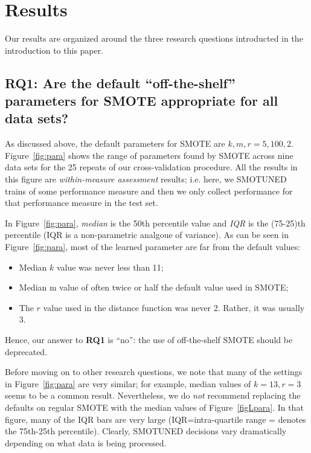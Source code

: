 \documentclass[10pt,conference]{IEEEtran}
\newcommand{\bi}{\begin{itemize}[leftmargin=0.4cm]}
\newcommand{\ei}{\end{itemize}}
\theoremstyle{break}
\theoremstyle{break}
\begin{document}
 
   

\section{Results}
\label{sect:results}

Our results are organized around the three
research questions introducted in the introduction
to this paper.

 \subsection{{\bf RQ1}: Are the default ``off-the-shelf'' parameters for SMOTE appropriate for all
 data sets?}
 
 
 As discussed above, the default parameters for
 SMOTE are $k,m,r = 5,100,2$.
  Figure~\ref{fig:para} shows the range of parameters
 found by SMOTE across  nine data sets for the 25 repeats of our cross-validation procedure.
 All the results in this figure are {\em within-measure assessment} results; i.e.
 here, we SMOTUNED trains of some performance measure and then we only collect performance for that performance measure in the test set.
 
 
 In  Figure~\ref{fig:para}, {\em median} is the 50th percentile
 value and {\em IQR} is the (75-25)th percentile
 (IQR is a non-parametric analgoue of variance).
 As can be seen in Figure~\ref{fig:para}, most of the learned parameter are far from the default values:
 \bi
 \item 
 Median $k$ value was never less than 11;
 \item
 Median m value of often twice or half the default value used in SMOTE;
 \item
 The $r$ value used in the distance function was never 2. Rather, it was usually 3.
 \ei
 Hence,  our answer to {\bf RQ1} is ``no'': the use of off-the-shelf SMOTE should be deprecated. 
   
Before moving on to other research questions, we note that many of the settings in Figure~\ref{fig:para} are very similar; for example, median values of $k=13,r=3$ seems to be a common
result.  Nevertheless, we do {\em not} recommend replacing
the defaults on regular SMOTE with the median values
of Figure~\ref{figLpara}. In that figure, many of the  IQR bars are
very large (IQR=intra-quartile range = denotes the
75th-25th percentile). Clearly, SMOTUNED  decisions vary dramatically
depending on what data  is being processed.   
\end{document}
